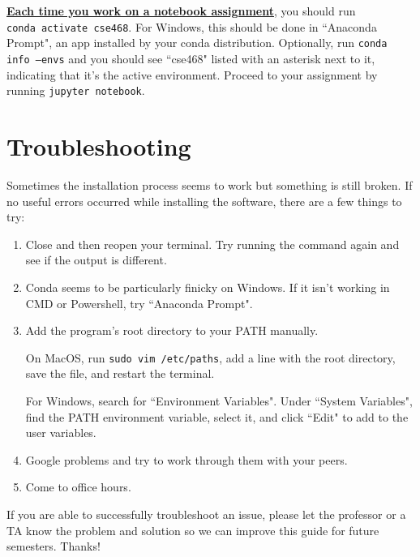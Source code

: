 \documentclass[12pt]{article}
\begin{document}
\textbf{\underline{Each time you work on a notebook assignment}}, you should run \\ \texttt{conda activate cse468}. For Windows, this should be done in ``Anaconda Prompt", an app installed by your conda distribution. Optionally, run \texttt{conda info --envs} and you should see ``cse468" listed with an asterisk next to it, indicating that it's the active environment. Proceed to your assignment by running \texttt{jupyter notebook}.




\section{Troubleshooting}
Sometimes the installation process seems to work but something is still broken. If no useful errors occurred while installing the software, there are a few things to try:
\begin{enumerate}
\item Close and then reopen your terminal. Try running the command again and see if the output is different.
\item Conda seems to be particularly finicky on Windows. If it isn't working in CMD or Powershell, try  ``Anaconda Prompt".
\item Add the program's root directory to your PATH manually.

On MacOS, run \texttt{sudo vim /etc/paths}, add a line with the root directory, save the file, and restart the terminal.

For Windows, search for ``Environment Variables". Under ``System Variables", find the PATH environment variable, select it, and click ``Edit" to add to the user variables. 

\item Google problems and try to work through them with your peers.
\item Come to office hours.

\end{enumerate}

If you are able to successfully troubleshoot an issue, please let the professor or a TA know the problem and solution so we can improve this guide for future semesters. Thanks!
\end{document}
